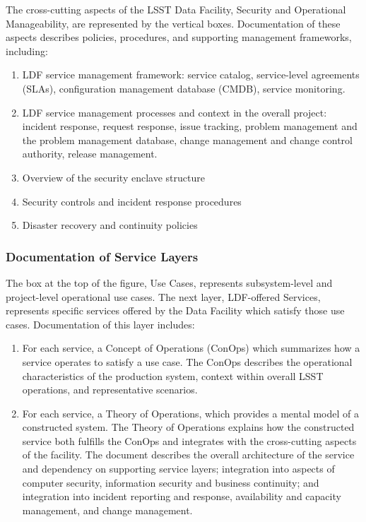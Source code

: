The cross-cutting aspects of the LSST Data Facility, Security and Operational Manageability, are represented by the vertical boxes. Documentation of these aspects describes policies, procedures, and supporting management frameworks, including:
\begin{enumerate}
	\item	LDF service management framework: service catalog, service-level agreements (SLAs), configuration management database (CMDB), service monitoring.
	\item	LDF service management processes and context in the overall project: incident response, request response, issue tracking, problem management and the problem management database, change management and change control authority, release management.
	\item	Overview of the security enclave structure
	\item	Security controls and incident response procedures
	\item	Disaster recovery and continuity policies
\end{enumerate}

\subsubsection{Documentation of Service Layers}

The box at the top of the figure, Use Cases, represents subsystem-level and project-level operational use cases. The next layer, LDF-offered Services, represents specific services offered by the Data Facility which satisfy those use cases. Documentation of this layer includes:

\begin{enumerate}
\item	For each service, a Concept of Operations (ConOps) which summarizes how a service operates to satisfy a use case. The ConOps describes the operational characteristics of the production system, context within overall LSST operations, and representative scenarios. 
\item	For each service, a Theory of Operations, which provides a mental model of a constructed system. The Theory of Operations explains how the constructed service both fulfills the ConOps and integrates with the cross-cutting aspects of the facility. The document describes the overall architecture of the service and dependency on supporting service layers; integration into aspects of computer security, information security and business continuity; and integration into incident reporting and response, availability and capacity management, and change management.
\end{enumerate}


